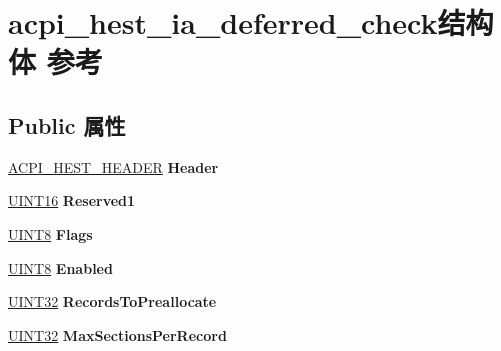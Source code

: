 \hypertarget{structacpi__hest__ia__deferred__check}{}\section{acpi\+\_\+hest\+\_\+ia\+\_\+deferred\+\_\+check结构体 参考}
\label{structacpi__hest__ia__deferred__check}
\subsection*{Public 属性}
\begin{DoxyCompactItemize}
\item 
\mbox{\label{structacpi__hest__ia__deferred__check_a7233d21ae9357d4620c839ef2c0d61c7}} 
\hyperlink{structacpi__hest__header}{A\+C\+P\+I\+\_\+\+H\+E\+S\+T\+\_\+\+H\+E\+A\+D\+ER} {\bfseries Header}
\item 
\mbox{\label{structacpi__hest__ia__deferred__check_af006298f43db1d5b79062654f96ae835}} 
\hyperlink{_processor_bind_8h_a09f1a1fb2293e33483cc8d44aefb1eb1}{U\+I\+N\+T16} {\bfseries Reserved1}
\item 
\mbox{\label{structacpi__hest__ia__deferred__check_a659a92dcbdff931e347cb1c6ec79d81a}} 
\hyperlink{_processor_bind_8h_ab27e9918b538ce9d8ca692479b375b6a}{U\+I\+N\+T8} {\bfseries Flags}
\item 
\mbox{\label{structacpi__hest__ia__deferred__check_aab6c7f859f7042a4b042a2a19f2461e7}} 
\hyperlink{_processor_bind_8h_ab27e9918b538ce9d8ca692479b375b6a}{U\+I\+N\+T8} {\bfseries Enabled}
\item 
\mbox{\label{structacpi__hest__ia__deferred__check_a4ffaeaf0e7f6b9ae286e8f11cebb2cd7}} 
\hyperlink{_processor_bind_8h_ae1e6edbbc26d6fbc71a90190d0266018}{U\+I\+N\+T32} {\bfseries Records\+To\+Preallocate}
\item 
\mbox{\label{structacpi__hest__ia__deferred__check_a89fa3ab3144442d5b692e1a1c68fa82f}} 
\hyperlink{_processor_bind_8h_ae1e6edbbc26d6fbc71a90190d0266018}{U\+I\+N\+T32} {\bfseries Max\+Sections\+Per\+Record}

\end{DoxyCompactItemize}
